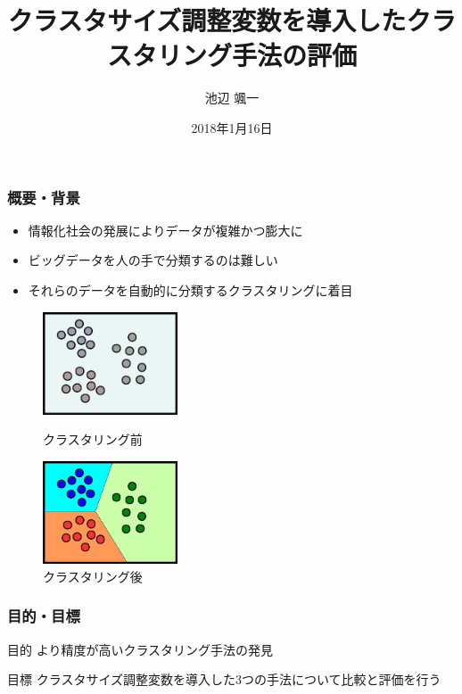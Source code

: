 \documentclass[13pt,dvipdfmx]{beamer}
\title{クラスタサイズ調整変数を導入したクラスタリング手法の評価}
\author{池辺 颯一}
\institute{芝浦工業大学 工学部 通信工学科}
\date{2018年1月16日}
\begin{document}
\begin{frame}\frametitle{}
  \titlepage
\end{frame}

\begin{frame}\frametitle{概要・背景}
  \begin{itemize}
  \item 情報化社会の発展によりデータが複雑かつ膨大に
  \item ビッグデータを人の手で分類するのは難しい
  \item それらのデータを自動的に分類するクラスタリングに着目
  \end{itemize}
  \vspace{5mm}
  \begin{figure}[htbp]
    \begin{minipage}{0.4\hsize}
      \begin{center}
        \includegraphics[width=40mm]{before_clustering.png}
      \end{center}
      \captionsetup{labelformat=empty,labelsep=none}
      \caption{クラスタリング前}
      \label{fig:one}
    \end{minipage}
    \hspace{1cm}
    \begin{minipage}{0.4\hsize}
      \begin{center}
        \includegraphics[width=40mm]{after_clustering.png}
      \end{center}
      \captionsetup{labelformat=empty,labelsep=none}
      \caption{クラスタリング後}
      \label{fig:two}
    \end{minipage}
  \end{figure}
\end{frame}

\begin{frame}\frametitle{目的・目標}
  \begin{block}{目的}
   より精度が高いクラスタリング手法の発見
  \end{block}
  \vspace{4mm}
  \begin{block}{目標}
   クラスタサイズ調整変数を導入した3つの手法について比較と評価を行う
  \end{block}
\end{frame}
\end{document}
